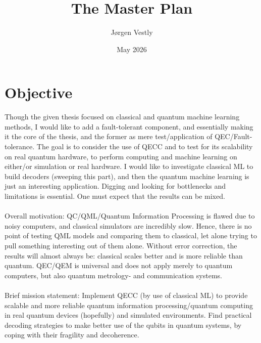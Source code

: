 \documentclass{article}
\title{The Master Plan}
\author{Jørgen Vestly}
\date{May 2026}
\begin{document}
\maketitle

\section{Objective}
Though the given thesis focused on classical and quantum machine learning methods, I would like to add a fault-tolerant component, and essentially making it the core of the thesis, and the former as mere test/application of QEC/Fault-tolerance. The goal is to consider the use of QECC and to test for its scalability on real quantum hardware, to perform computing and machine learning on either/or simulation or real hardware. I would like to investigate classical ML to build decoders (sweeping this part), and then the quantum machine learning is just an interesting application. Digging and looking for bottlenecks and limitations is essential. One must expect that the results can be mixed.\\\\ Overall motivation: QC/QML/Quantum Information Processing is flawed due to noisy computers, and classical simulators are incredibly slow. Hence, there is no point of testing QML models and comparing them to classical, let alone trying to pull something interesting out of them alone. Without error correction, the results will almost always be: classical scales better and is more reliable than quantum. QEC/QEM is universal and does not apply merely to quantum computers, but also quantum metrology- and communication systems.\\\\
Brief mission statement: Implement QECC (by use of classical ML) to provide scalable and more reliable quantum information processing/quantum computing in real quantum devices (hopefully) and simulated environments. Find practical decoding strategies to make better use of the qubits in quantum systems, by coping with their fragility and decoherence.
\end{document}
